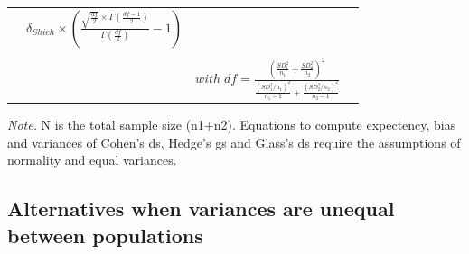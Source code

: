 \documentclass[
  man,floatsintext]{apa6}
\begin{document}
\begin{landscape}
\begin{longtable}[]{@{}lccc@{}}
\begin{minipage}[t]{0.18\columnwidth}
\end{minipage} & \begin{minipage}[t]{0.24\columnwidth}\centering
\tiny\(\delta_{Shieh} \times \left(\frac{\sqrt{\frac{df}{2}} \times \Gamma(\frac{df-1}{2})}{\Gamma(\frac{df}{2})}-1 \right)\)\strut
\end{minipage} & \begin{minipage}[t]{0.40\columnwidth}\centering
\strut
\end{minipage}\tabularnewline
\begin{minipage}[t]{0.08\columnwidth}\raggedright
\strut
\end{minipage} & \begin{minipage}[t]{0.18\columnwidth}\centering
\strut
\end{minipage} & \begin{minipage}[t]{0.24\columnwidth}\centering
\strut
\end{minipage} & \begin{minipage}[t]{0.40\columnwidth}\centering
\strut
\end{minipage}\tabularnewline
\begin{minipage}[t]{0.08\columnwidth}\raggedright
\strut
\end{minipage} & \begin{minipage}[t]{0.18\columnwidth}\centering
\strut
\end{minipage} & \begin{minipage}[t]{0.24\columnwidth}\centering
\tiny\(with \; df=\frac{\left(\frac{SD^2_1}{n_1}+\frac{SD^2_2}{n_2} \right)^2}{\frac{(SD^2_1/n_1)^2}{n_1-1}+\frac{(SD^2_2/n_2)^2}{n_2-1}}\)\strut
\end{minipage} & \begin{minipage}[t]{0.40\columnwidth}\centering
\strut
\end{minipage}\tabularnewline
\bottomrule
\end{longtable}

\emph{Note.} N is the total sample size (n1+n2). Equations to compute expectency, bias and variances of Cohen's ds, Hedge's gs and Glass's ds require the assumptions of normality and equal variances.

\end{landscape}

\newpage

\hypertarget{alternatives-when-variances-are-unequal-between-populations}{%
\subsection{Alternatives when variances are unequal between populations}\label{alternatives-when-variances-are-unequal-between-populations}}
\end{document}
